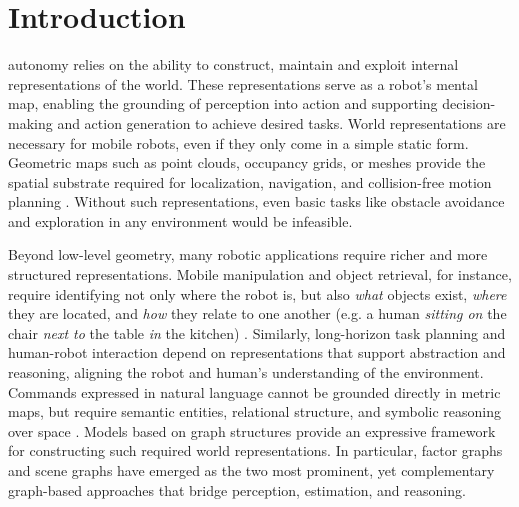 \section{Introduction}\label{sec:introduction}
 autonomy relies on the ability to construct, maintain and exploit internal representations of the world.
These representations serve as a robot's mental map, enabling the grounding of perception into action and supporting decision-making and action generation to achieve desired tasks. %
World representations are necessary for mobile robots, even if they only come in a simple static form. Geometric maps such as point clouds, occupancy grids, or meshes provide the spatial substrate required for localization, navigation, and collision-free motion planning \cite{luca_carlone_slam_2025}.
Without such representations, even basic tasks like obstacle avoidance and exploration in any environment would be infeasible.

Beyond low-level geometry, many robotic applications require richer and more structured representations. 
Mobile manipulation and object retrieval, for instance, require identifying not only where the robot is, but also \textit{what} objects exist, \textit{where} they are located, and \textit{how} they relate to one another (e.g. a human \textit{sitting on} the chair \textit{next to} the table \textit{in} the kitchen) \cite{bavle_slam_2023}.
Similarly, long-horizon task planning and human-robot interaction depend on representations that support abstraction and reasoning, aligning the robot and human's understanding of the environment. 
Commands expressed in natural language cannot be grounded directly in metric maps, but require semantic entities, relational structure, and symbolic reasoning over space \cite{maggio_clio_2024} \cite{rana2023sayplangroundinglargelanguage}.
Models based on graph structures provide an expressive framework for constructing such required world representations. In particular, factor graphs and scene graphs have emerged as the two most prominent, yet complementary graph-based approaches that bridge perception, estimation, and reasoning. 

